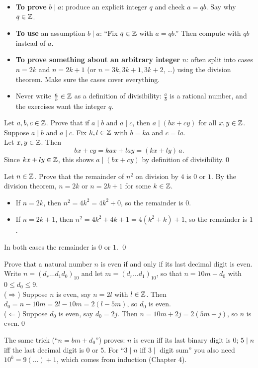 \begin{strategy}
\begin{itemize}
\item \textbf{To prove} $b\mid a$: produce an explicit integer $q$ and check $a=qb$. Say why $q\in\mathbb{Z}$.
\item \textbf{To use} an assumption $b\mid a$: ``Fix $q\in\mathbb{Z}$ with $a=qb$.'' Then compute with $qb$ instead of $a$.
\item \textbf{To prove something about an arbitrary integer} $n$: often split into cases $n=2k$ and $n=2k+1$ (or $n=3k,3k+1,3k+2$, \dots) using the division theorem. Make sure the cases cover everything.
\item Never write $\frac{a}{b}\in\mathbb{Z}$ as a definition of divisibility: $\frac ab$ is a rational number, and the exercises want the integer $q$.
\end{itemize}
\end{strategy}

\begin{hexample}\label{ex:lincomb}
Let $a,b,c\in\mathbb{Z}$. Prove that if $a\mid b$ and $a\mid c$, then $a\mid(bx+cy)$ for all $x,y\in\mathbb{Z}$.
\solution
Suppose $a\mid b$ and $a\mid c$. Fix $k,l\in\mathbb{Z}$ with $b=ka$ and $c=la$.\\
Let $x,y\in\mathbb{Z}$. Then
\[
bx+cy=kax+lay=(kx+ly)\,a .
\]
Since $kx+ly\in\mathbb{Z}$, this shows $a\mid(bx+cy)$ by definition of divisibility.\qed
\end{hexample}

\begin{hexample}\label{ex:sqmod4}
Let $n\in\mathbb{Z}$. Prove that the remainder of $n^2$ on division by $4$ is $0$ or $1$.
\solution
By the division theorem, $n=2k$ or $n=2k+1$ for some $k\in\mathbb{Z}$.
\begin{itemize}
\item If $n=2k$, then $n^2=4k^2=4k^2+0$, so the remainder is $0$.
\item If $n=2k+1$, then $n^2=4k^2+4k+1=4(k^2+k)+1$, so the remainder is $1$.
\end{itemize}
In both cases the remainder is $0$ or $1$. \qed
\end{hexample}

\begin{hexample}
Prove that a natural number $n$ is even if and only if its last decimal digit is even.
\solution
Write $n=(d_r\dots d_1d_0)_{10}$ and let $m=(d_r\dots d_1)_{10}$, so that $n=10m+d_0$ with $0\le d_0\le9$.\\
($\Rightarrow$) Suppose $n$ is even, say $n=2l$ with $l\in\mathbb{Z}$. Then $d_0=n-10m=2l-10m=2(l-5m)$, so $d_0$ is even.\\
($\Leftarrow$) Suppose $d_0$ is even, say $d_0=2j$. Then $n=10m+2j=2(5m+j)$, so $n$ is even.\qed
\end{hexample}
The same trick (``$n=bm+d_0$'') proves: $n$ is even iff its last binary digit is $0$; $5\mid n$ iff the last decimal digit is $0$ or $5$. For ``$3\mid n$ iff $3\mid$ digit sum'' you also need $10^k=9(\dots)+1$, which comes from induction (Chapter 4).

